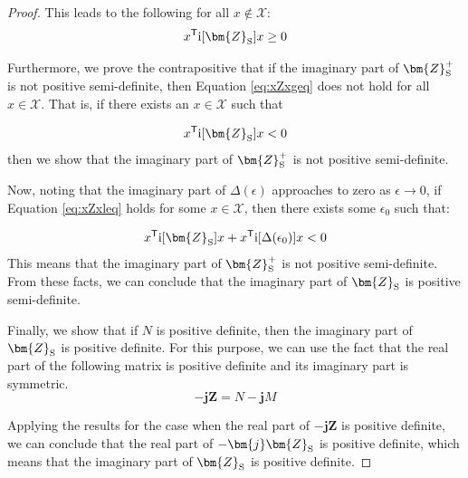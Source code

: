 \documentclass[graybox, envcountchap]{svmult}
\begin{document}
\begin{proof}
This leads to the following for all $x \notin \mathcal{X}$:
\begin{equation}\label{eq:xZxgeq}
  x^{\sf T}\imag[\bm{Z}_{\rm S}] x \geq 0
\end{equation}

Furthermore, we prove the contrapositive that if the imaginary part of $
\bm{Z}_{\rm S}^{+} $ is not positive semi-definite, then Equation
\ref{eq:xZxgeq} does not hold for all $x \in \mathcal{X}$. That is, if there
exists an $x \in \mathcal{X}$ such that 

\begin{equation}\label{eq:xZxleq}
  x^{\sf T} \imag[\bm{Z}_{\rm S}] x < 0
\end{equation}
then we show that the imaginary part of $ \bm{Z}_{\rm S}^{+} $ is not positive
semi-definite. 

Now, noting that the imaginary part of $ \Delta(\epsilon)$ approaches to zero as
$\epsilon \rightarrow 0$, if Equation \ref{eq:xZxleq} holds for some $x \in
\mathcal{X}$, then there exists some $\epsilon_0$ such that:

\begin{equation*}
x^{\sf T} \imag[ \bm{Z}_{\rm S}] x 
+
x^{\sf T} \imag[\Delta(\epsilon_0)]x < 0
\end{equation*}
This means that the imaginary part of $\bm{Z}_{\rm S}^{+} $ is not positive
semi-definite. From these facts, we can conclude that the imaginary part of
$\bm{Z}_{\rm S}$ is positive semi-definite.

Finally, we show that if $N$ is positive definite, then the imaginary part of
$\bm{Z}_{\rm S}$ is positive definite. For this purpose, we can use the fact
that the real part of the following matrix is positive definite and its
imaginary part is symmetric.
\begin{equation*}
-\bm{j} \bm{Z} = N - \bm{j} M
\end{equation*}

Applying the results for the case when the real part of $-\bm{j} \bm{Z}$ is
positive definite, we can conclude that the real part of $-\bm{j} \bm{Z}_{\rm
S}$ is positive definite, which means that the imaginary part of $\bm{Z}_{\rm
S}$ is positive definite.
\end{proof}

\end{document}
